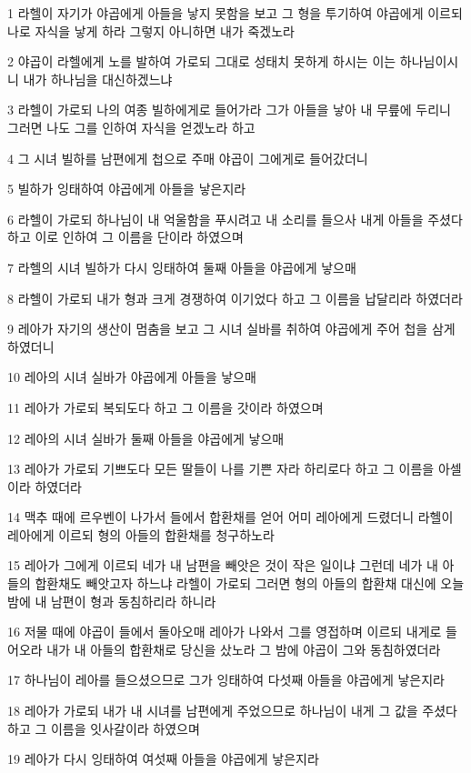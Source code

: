 \par 1 라헬이 자기가 야곱에게 아들을 낳지 못함을 보고 그 형을 투기하여 야곱에게 이르되 나로 자식을 낳게 하라 그렇지 아니하면 내가 죽겠노라
\par 2 야곱이 라헬에게 노를 발하여 가로되 그대로 성태치 못하게 하시는 이는 하나님이시니 내가 하나님을 대신하겠느냐
\par 3 라헬이 가로되 나의 여종 빌하에게로 들어가라 그가 아들을 낳아 내 무릎에 두리니 그러면 나도 그를 인하여 자식을 얻겠노라 하고
\par 4 그 시녀 빌하를 남편에게 첩으로 주매 야곱이 그에게로 들어갔더니
\par 5 빌하가 잉태하여 야곱에게 아들을 낳은지라
\par 6 라헬이 가로되 하나님이 내 억울함을 푸시려고 내 소리를 들으사 내게 아들을 주셨다 하고 이로 인하여 그 이름을 단이라 하였으며
\par 7 라헬의 시녀 빌하가 다시 잉태하여 둘째 아들을 야곱에게 낳으매
\par 8 라헬이 가로되 내가 형과 크게 경쟁하여 이기었다 하고 그 이름을 납달리라 하였더라
\par 9 레아가 자기의 생산이 멈춤을 보고 그 시녀 실바를 취하여 야곱에게 주어 첩을 삼게 하였더니
\par 10 레아의 시녀 실바가 야곱에게 아들을 낳으매
\par 11 레아가 가로되 복되도다 하고 그 이름을 갓이라 하였으며
\par 12 레아의 시녀 실바가 둘째 아들을 야곱에게 낳으매
\par 13 레아가 가로되 기쁘도다 모든 딸들이 나를 기쁜 자라 하리로다 하고 그 이름을 아셀이라 하였더라
\par 14 맥추 때에 르우벤이 나가서 들에서 합환채를 얻어 어미 레아에게 드렸더니 라헬이 레아에게 이르되 형의 아들의 합환채를 청구하노라
\par 15 레아가 그에게 이르되 네가 내 남편을 빼앗은 것이 작은 일이냐 그런데 네가 내 아들의 합환채도 빼앗고자 하느냐 라헬이 가로되 그러면 형의 아들의 합환채 대신에 오늘 밤에 내 남편이 형과 동침하리라 하니라
\par 16 저물 때에 야곱이 들에서 돌아오매 레아가 나와서 그를 영접하며 이르되 내게로 들어오라 내가 내 아들의 합환채로 당신을 샀노라 그 밤에 야곱이 그와 동침하였더라
\par 17 하나님이 레아를 들으셨으므로 그가 잉태하여 다섯째 아들을 야곱에게 낳은지라
\par 18 레아가 가로되 내가 내 시녀를 남편에게 주었으므로 하나님이 내게 그 값을 주셨다 하고 그 이름을 잇사갈이라 하였으며
\par 19 레아가 다시 잉태하여 여섯째 아들을 야곱에게 낳은지라
